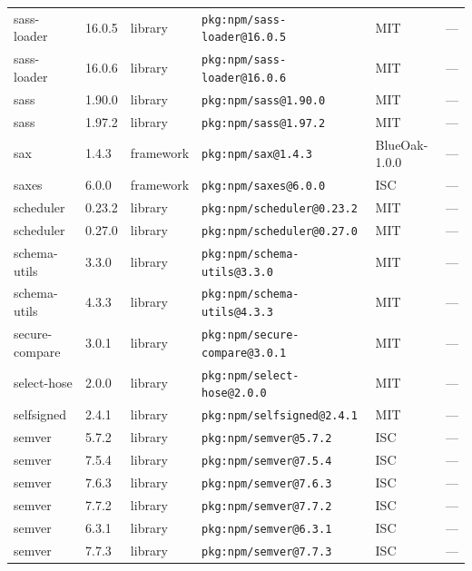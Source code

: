 \documentclass[11pt,a4paper]{article}
\begin{document}
\begin{longtable}{|p{4cm}|p{2cm}|p{1.6cm}|p{5cm}|p{1.5cm}|p{3.5cm}|}
\raggedright sass-loader & 16.0.5 & library & \small\texttt{pkg:npm/sass-loader@16.0.5} & MIT & \small — \\
\raggedright sass-loader & 16.0.6 & library & \small\texttt{pkg:npm/sass-loader@16.0.6} & MIT & \small — \\
\raggedright sass & 1.90.0 & library & \small\texttt{pkg:npm/sass@1.90.0} & MIT & \small — \\
\raggedright sass & 1.97.2 & library & \small\texttt{pkg:npm/sass@1.97.2} & MIT & \small — \\
\raggedright sax & 1.4.3 & framework & \small\texttt{pkg:npm/sax@1.4.3} & BlueOak-1.0.0 & \small — \\
\raggedright saxes & 6.0.0 & framework & \small\texttt{pkg:npm/saxes@6.0.0} & ISC & \small — \\
\raggedright scheduler & 0.23.2 & library & \small\texttt{pkg:npm/scheduler@0.23.2} & MIT & \small — \\
\raggedright scheduler & 0.27.0 & library & \small\texttt{pkg:npm/scheduler@0.27.0} & MIT & \small — \\
\raggedright schema-utils & 3.3.0 & library & \small\texttt{pkg:npm/schema-utils@3.3.0} & MIT & \small — \\
\raggedright schema-utils & 4.3.3 & library & \small\texttt{pkg:npm/schema-utils@4.3.3} & MIT & \small — \\
\raggedright secure-compare & 3.0.1 & library & \small\texttt{pkg:npm/secure-compare@3.0.1} & MIT & \small — \\
\raggedright select-hose & 2.0.0 & library & \small\texttt{pkg:npm/select-hose@2.0.0} & MIT & \small — \\
\raggedright selfsigned & 2.4.1 & library & \small\texttt{pkg:npm/selfsigned@2.4.1} & MIT & \small — \\
\raggedright semver & 5.7.2 & library & \small\texttt{pkg:npm/semver@5.7.2} & ISC & \small — \\
\raggedright semver & 7.5.4 & library & \small\texttt{pkg:npm/semver@7.5.4} & ISC & \small — \\
\raggedright semver & 7.6.3 & library & \small\texttt{pkg:npm/semver@7.6.3} & ISC & \small — \\
\raggedright semver & 7.7.2 & library & \small\texttt{pkg:npm/semver@7.7.2} & ISC & \small — \\
\raggedright semver & 6.3.1 & library & \small\texttt{pkg:npm/semver@6.3.1} & ISC & \small — \\
\raggedright semver & 7.7.3 & library & \small\texttt{pkg:npm/semver@7.7.3} & ISC & \small — \\

\end{longtable}
\end{document}
